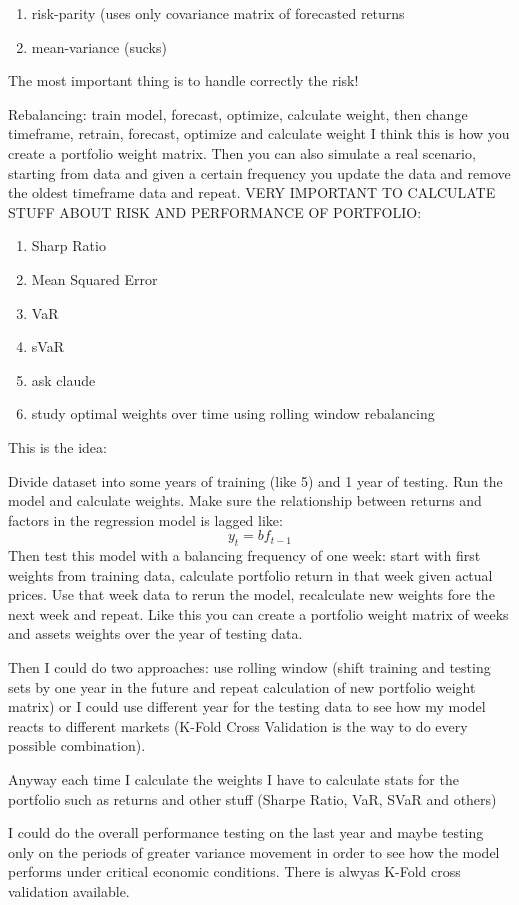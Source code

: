 \begin{enumerate}
    \item risk-parity (uses only covariance matrix of forecasted returns
    \item mean-variance (sucks)
\end{enumerate}
The most important thing is to handle correctly the risk!

Rebalancing: train model, forecast, optimize, calculate weight, then change timeframe, retrain, forecast, optimize and calculate weight
I think this is how you create a portfolio weight matrix.
Then you can also simulate a real scenario, starting from data and given a certain frequency you update the data and remove the oldest timeframe data and repeat.
VERY IMPORTANT TO CALCULATE STUFF ABOUT RISK AND PERFORMANCE OF PORTFOLIO:
\begin{enumerate}
    \item Sharp Ratio
    \item Mean Squared Error
    \item VaR
    \item sVaR
    \item ask claude
    \item study optimal weights over time using rolling window rebalancing
\end{enumerate}

This is the idea:

Divide dataset into some years of training (like 5) and 1 year of testing. Run the model and calculate weights. Make sure the relationship between returns and factors in the regression model is lagged like:
\begin{equation}
    y_t = bf_{t-1}
\end{equation}
Then test this model with a balancing frequency of one week: start with first weights from training data, calculate portfolio return in that week given actual prices. Use that week data to rerun the model, recalculate new weights fore the next week and repeat. Like this you can create a portfolio weight matrix of weeks and assets weights over the year of testing data. 

Then I could do two approaches: use rolling window (shift training and testing sets by one year in the future and repeat calculation of new portfolio weight matrix) or I could use different year for the testing data to see how my model reacts to different markets (K-Fold Cross Validation is the way to do every possible combination).

Anyway each time I calculate the weights I have to calculate stats for the portfolio such as returns and other stuff (Sharpe Ratio, VaR, SVaR and others)

I could do the overall performance testing on the last year and maybe testing only on the periods of greater variance movement in order to see how the model performs under critical economic conditions. 
There is alwyas K-Fold cross validation available.